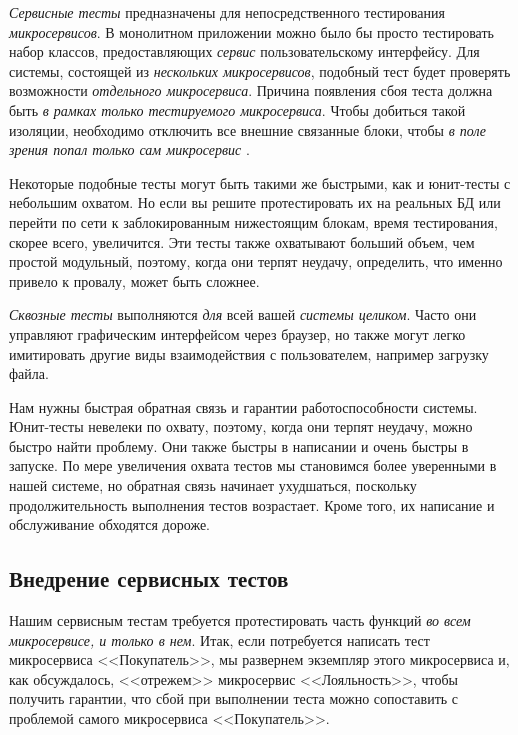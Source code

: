\documentclass[%
	11pt,
	a4paper,
	utf8,
		]{article}
\begin{document}
\emph{Сервисные тесты} предназначены для непосредственного тестирования \emph{микросервисов}. В монолитном приложении можно было бы просто тестировать набор классов, предоставляющих \emph{сервис} пользовательскому интерфейсу. Для системы, состоящей из \emph{нескольких микросервисов}, подобный тест будет проверять возможности \emph{отдельного микросервиса}. Причина появления сбоя теста должна быть \emph{\color{blue}в рамках только тестируемого микросервиса}. Чтобы добиться такой изоляции, необходимо отключить все внешние связанные блоки, чтобы \emph{\color{blue}в поле зрения попал только сам микросервис} \cite[]{microservices-2024}.

Некоторые подобные тесты могут быть такими же быстрыми, как и юнит-тесты с небольшим охватом. Но если вы решите протестировать их на реальных БД или перейти по сети к заблокированным нижестоящим блокам, время тестирования, скорее всего, увеличится. Эти тесты также охватывают больший объем, чем простой модульный, поэтому, когда они терпят неудачу, определить, что именно привело к провалу, может быть сложнее. 

\emph{Сквозные тесты} выполняются \emph{для} всей вашей \emph{системы целиком}. Часто они управляют графическим интерфейсом через браузер, но также могут легко имитировать другие виды взаимодействия с пользователем, например загрузку файла.

Нам нужны быстрая обратная связь и гарантии работоспособности системы. Юнит-тесты невелеки по охвату, поэтому, когда они терпят неудачу, можно быстро найти проблему. Они также быстры в написании и очень быстры в запуске. По мере увеличения охвата тестов мы становимся более уверенными в нашей системе, но обратная связь начинает ухудшаться, поскольку продолжительность выполнения тестов возрастает. Кроме того, их написание и обслуживание обходятся дороже.

\subsection{Внедрение сервисных тестов}

Нашим сервисным тестам требуется протестировать часть функций \emph{во всем микросервисе, и только в нем}. Итак, если потребуется написать тест микросервиса <<Покупатель>>, мы развернем экземпляр этого микросервиса и, как обсуждалось, <<отрежем>> микросервис <<Лояльность>>, чтобы получить гарантии, что сбой при выполнении теста можно сопоставить с проблемой самого микросервиса <<Покупатель>>.
\end{document}
